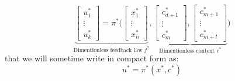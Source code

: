 \begin{equation}
\underbrace{
\begin{bmatrix}
u_1^* \\
\vdots \\
u_k^*
\end{bmatrix}
=
\pi^* \Biggl(
\begin{bmatrix}
x_1^* \\
\vdots \\
x_n^*
\end{bmatrix}
}_{\text{Dimentionless feedback law $f^*$}}
,
\underbrace{
\begin{bmatrix}
c_{d+1}^* \\
\vdots \\
c_{m}^*
\end{bmatrix}
,
\begin{bmatrix}
c_{m+1}^* \\
\vdots \\
c_{m+l}^*
\end{bmatrix}
}_{\text{Dimentionless context $c^*$}}
\Biggr)
\label{eq:vectordimpolicy}
\end{equation}
that we will sometime write in compact form as: 
\begin{equation}
u^* = \pi^*( x^* , c^* )
\label{eq:vectordimpolicyshort}
\end{equation}

